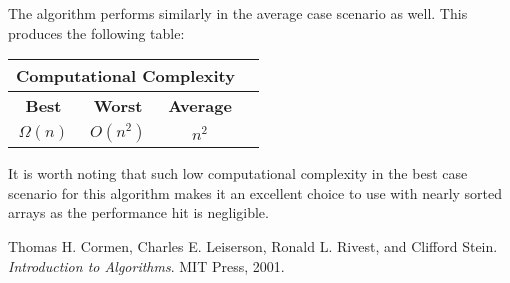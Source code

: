 \documentclass[titlepage, a4paper, 12pt]{article}
\begin{document}
    The algorithm performs similarly in the average case scenario as well. This produces the following table:

    \begin{table}[h]
        \centering
        \begin{tabular}{|c|c|c|c|}
            \hline
            \multicolumn{3}{|c|}{Computational Complexity} \\
            \hline
            \textbf{Best} & \textbf{Worst} & \textbf{Average} \\
            \hline
            \small$\Omega(n)$ & \small$O(n^2)$ & \small$n^2$ \\
            \hline
        \end{tabular}
    \end{table}

    It is worth noting that such low computational complexity in the best case scenario for this algorithm makes it an excellent choice to use with nearly sorted arrays as the performance hit is negligible.

    \clearpage
    \begin{thebibliography}{1}
        Thomas H. Cormen, Charles E. Leiserson, Ronald L. Rivest, and Clifford Stein.
        \newblock \emph{Introduction to Algorithms}.
        \newblock MIT Press, 2001.
    \end{thebibliography}
\end{document}
